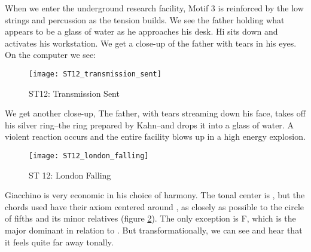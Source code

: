 When we enter the underground research facility, Motif 3 is reinforced by the low strings and percussion as the tension builds. We see the father holding what appears to be a glass of water as he approaches his desk. Hi sits down and activates his workstation. We get a close-up of the father with tears in his eyes. On the computer we see:
\begin{figure}[h!]
\center
\texttt{[image: ST12\_transmission\_sent]}
	\caption{ST12: Transmission Sent}
	\label{ST12_transmission_sent}
\end{figure}

\noindent We get another close-up, The father, with tears streaming down his face, takes off his silver ring--the ring prepared by Kahn--and drops it into a glass of water. A violent reaction occurs and the entire facility blows up in a high energy explosion.

\begin{figure}
\center
\texttt{[image: ST12\_london\_falling]}
	\caption{ST 12: London Falling}
	\label{ST12_london_falling}
\end{figure}

Giacchino is very economic in his choice of harmony. The tonal center is \bflatm, but the chords used have their axiom centered around \fiss, as closely as possible to the circle of fifths and its minor relatives (figure \ref{ST12_london_falling}). The only exception is F, which is the major dominant in relation to \bflatm. But transformationally, we can see and hear that it feels quite far away tonally. 

\clearpage


